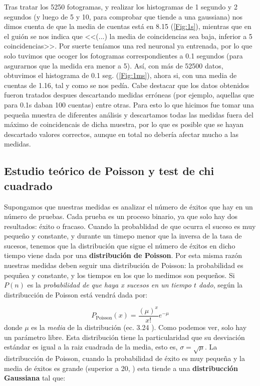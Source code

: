 \documentclass[11pt]{article}
\begin{document}
\vspace{1em}

Tras tratar los 5250 fotogramas, y realizar los histogramas de 1 segundo y 2 segundos (y luego de 5 y 10, para comprobar que tiende a una gaussiana) nos dimos cuenta de que la media de cuentas está en 8.15 (\cref{Fig:1s}), mientras que en el guión \cite{P2} se nos indica que <<(...) la media de coincidencias sea baja, inferior a 5 coincidencias>>. Por suerte teníamos una red neuronal ya entrenada, por lo que solo tuvimos que ocoger los fotogramas correspondientes a 0.1 segundos (para asgurarnos que la medida era menor a 5). Así, con más de 52500 datos, obtuvimos el histograma de 0.1 seg. (\cref{Fig:1ms}), ahora si, con una media de cuentas de 1.16, tal y como se nos pedía. Cabe destacar que los datos obtenidos fueron tratados despues descartando medidas erróneas (por ejemplo, aquellas que para 0.1s daban 100 cuentas) entre otras. Para esto lo que hicimos fue tomar una pequeña muestra de diferentes análisis y descartamos todas las medidas fuera del máximo de coincidencais de dicha muestra, por lo que es posible que se hayan descartado valores correctos, aunque en total no debería afectar mucho a las medidas. 

\subsection{Estudio teórico de Poisson y test de chi cuadrado} 

Supongamos que nuestras medidas es analizar el número de éxitos que hay en un número de pruebas. Cada prueba es un proceso binario, ya que solo hay dos resultados: éxito o fracaso. Cuando la probablidad de que ocurra el suceso es muy pequeño y constante, y durante un timepo menor que la inversa de la tasa de sucesos, tenemos que la distribución que sigue el número de éxitos en dicho tiempo viene dada por una \textbf{distribución de Poisson}. Por esta misma razón nuestras medidas deben seguir una distribución de Poisson: la probabilidad es pequñea y constante, y los tiempos en los que lo medimos son pequeños. Si $P(n)$ es la \textit{probabilidad de que haya x sucesos en un tiempo $t$ dado}, según la distribucción de Poisson está vendrá dada por: 

\begin{equation}
	P_{\text{Poisson}}(x) = \frac{(\mu)^x}{x!} e^{-\mu}
\end{equation}
donde $\mu$ es la \textit{media} de la distribución (ec. 3.24 \cite{Knoll:1300754}). Como podemos ver, solo hay un parámetro libre. Esta distribución tiene la particularidad que su desviación estándar es igual a la raiz cuadrada de la media, esto es, $\sigma = \sqrt{\mu}$. La distribucción de Poisson, cuando la probabilidad de éxito es muy pequeña y la media de éxitos es grande (superior a 20, \cite{Knoll:1300754}) esta tiende a una \textbf{distribucción Gaussiana} tal que: 
\end{document}
